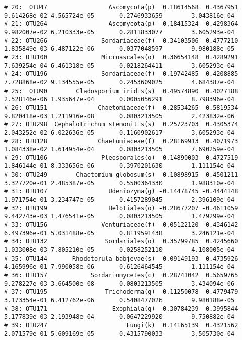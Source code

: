 \documentclass[
]{article}
\begin{document}
\begin{verbatim}
# 20:  OTU47                 Ascomycota(p)  0.18614568  0.4367951 9.614268e-02 4.565724e-05       0.2746933659        3.043816e-04
# 21: OTU264                 Ascomycota(p) -0.18415324 -0.4298364 9.982007e-02 6.210333e-05       0.2811833077        3.605293e-04
# 22: OTU266               Sordariaceae(f)  0.34103506  0.4777210 1.835849e-03 6.487122e-06       0.0377048597        9.980188e-05
# 23: OTU100               Microascales(o)  0.36654148  0.4289291 7.639254e-04 6.461318e-05       0.0218264411        3.605293e-04
# 24: OTU196               Sordariaceae(f)  0.19742485  0.4208885 7.728868e-02 9.134555e-05       0.2453609025        4.684387e-04
# 25:  OTU90        Cladosporium iridis(s)  0.49574890  0.4027188 2.528146e-06 1.935647e-04       0.0005056291        8.798396e-04
# 26: OTU151              Chaetomiaceae(f)  0.28534265  0.5819534 9.820418e-03 1.211916e-08       0.0803213505        2.423832e-06
# 27: OTU298  Cephalotrichum stemonitis(s)  0.25723703  0.4305374 2.043252e-02 6.022636e-05       0.1160902617        3.605293e-04
# 28: OTU128              Chaetomiaceae(f)  0.28169913  0.4071973 1.084338e-02 1.614954e-04       0.0803213505        7.690259e-04
# 29: OTU106               Pleosporales(o)  0.14890003  0.4727519 1.846144e-01 8.333656e-06       0.3970201630        1.111154e-04
# 30: OTU249        Chaetomium globosum(s)  0.10898915  0.4501211 3.327720e-01 2.485387e-05       0.5500364330        1.988310e-04
# 31: OTU107                 Udeniozyma(g) -0.14478745 -0.4444148 1.971754e-01 3.234747e-05       0.4157289045        2.396109e-04
# 32: OTU199                 Helotiales(o) -0.28677207 -0.4611059 9.442743e-03 1.476541e-05       0.0803213505        1.479299e-04
# 33: OTU156               Venturiaceae(f) -0.05122120 -0.4346142 6.497396e-01 5.031488e-05       0.8119591438        3.246121e-04
# 34: OTU132                Sordariales(o)  0.35799785  0.4245660 1.033008e-03 7.805210e-05       0.0258252110        4.108005e-04
# 35: OTU144       Rhodotorula babjevae(s)  0.09149193  0.4735926 4.165996e-01 7.990058e-06       0.6126464545        1.111154e-04
# 36: OTU157            Sordariomycetes(c)  0.28741042  0.5659765 9.278227e-03 3.664500e-08       0.0803213505        3.434094e-06
# 37: OTU195                Trichoderma(g)  0.11250078  0.4779479 3.173354e-01 6.412762e-06       0.5408477026        9.980188e-05
# 38: OTU171                  Exophiala(g)  0.30784239  0.3995844 5.177839e-03 2.193948e-04       0.0647229920        9.750882e-04
# 39: OTU247                      Fungi(k)  0.14165139  0.4321562 2.071579e-01 5.609169e-05       0.4315790033        3.505730e-04

\end{verbatim}
\end{document}
